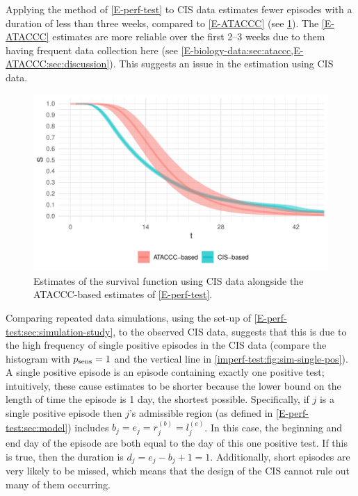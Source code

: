\documentclass[thesis.tex]{subfiles}
\begin{document}
Applying the method of \cref{E-perf-test} to CIS data estimates fewer episodes with a duration of less than three weeks, compared to \cref{E-ATACCC} (see \cref{imperf-test:fig:problem-cis-estimates}).
The \cref{E-ATACCC} estimates are more reliable over the first 2--3 weeks due to them having frequent data collection here (see \cref{E-biology-data:sec:ataccc,E-ATACCC:sec:discussion}).
This suggests an issue in the estimation using CIS data.
\begin{figure}
  \centering \includegraphics{cis-imperfect-testing/CIS_perfect}
  \caption[Estimating survival using CIS data assuming perfect testing]{Estimates of the survival function using CIS data alongside the ATACCC-based estimates of \cref{E-perf-test}. \label{imperf-test:fig:problem-cis-estimates}}
\end{figure}

Comparing repeated data simulations, using the set-up of \cref{E-perf-test:sec:simulation-study}, to the observed CIS data, suggests that this is due to the high frequency of single positive episodes in the CIS data (compare the histogram with $p_\text{sens}=1$ and the vertical line in \cref{imperf-test:fig:sim-single-pos}).
A single positive episode is an episode containing exactly one positive test; intuitively, these cause estimates to be shorter because the lower bound on the length of time the episode is 1 day, the shortest possible.
Specifically, if $j$ is a single positive episode then $j$'s admissible region (as defined in \cref{E-perf-test:sec:model}) includes $b_j = e_j = r_j^{(b)} = l_j^{(e)}$.
In this case, the beginning and end day of the episode are both equal to the day of this one positive test.
If this is true, then the duration is $d_j = e_j - b_j + 1 = 1$.
Additionally, short episodes are very likely to be missed, which means that the design of the CIS cannot rule out many of them occurring.
\end{document}
